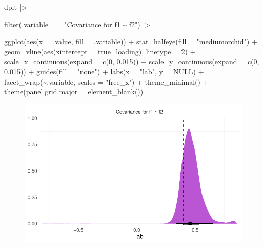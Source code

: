 \documentclass[
  letterpaper,
  DIV=11,
  numbers=noendperiod]{scrreprt}
\newenvironment{Shaded}{\begin{snugshade}}{\end{snugshade}}
\newcommand{\AttributeTok}[1]{\textcolor[rgb]{0.40,0.45,0.13}{#1}}
\newcommand{\ConstantTok}[1]{\textcolor[rgb]{0.56,0.35,0.01}{#1}}
\newcommand{\DecValTok}[1]{\textcolor[rgb]{0.68,0.00,0.00}{#1}}
\newcommand{\FloatTok}[1]{\textcolor[rgb]{0.68,0.00,0.00}{#1}}
\newcommand{\FunctionTok}[1]{\textcolor[rgb]{0.28,0.35,0.67}{#1}}
\newcommand{\NormalTok}[1]{\textcolor[rgb]{0.00,0.23,0.31}{#1}}
\newcommand{\SpecialCharTok}[1]{\textcolor[rgb]{0.37,0.37,0.37}{#1}}
\newcommand{\StringTok}[1]{\textcolor[rgb]{0.13,0.47,0.30}{#1}}
\begin{document}
\begin{Shaded}
\begin{Highlighting}[]
\NormalTok{dplt }\SpecialCharTok{|\textgreater{}}

  \FunctionTok{filter}\NormalTok{(.variable }\SpecialCharTok{==} \StringTok{"Covariance for f1 \textasciitilde{} f2"}\NormalTok{) }\SpecialCharTok{|\textgreater{}}

  \FunctionTok{ggplot}\NormalTok{(}\FunctionTok{aes}\NormalTok{(}\AttributeTok{x =}\NormalTok{ .value, }\AttributeTok{fill =}\NormalTok{ .variable)) }\SpecialCharTok{+}
  \FunctionTok{stat\_halfeye}\NormalTok{(}\AttributeTok{fill =} \StringTok{"mediumorchid"}\NormalTok{) }\SpecialCharTok{+}
  \FunctionTok{geom\_vline}\NormalTok{(}\FunctionTok{aes}\NormalTok{(}\AttributeTok{xintercept =}\NormalTok{ true\_loading), }\AttributeTok{linetype =} \DecValTok{2}\NormalTok{) }\SpecialCharTok{+} 
  \FunctionTok{scale\_x\_continuous}\NormalTok{(}\AttributeTok{expand =} \FunctionTok{c}\NormalTok{(}\DecValTok{0}\NormalTok{, }\FloatTok{0.015}\NormalTok{)) }\SpecialCharTok{+}
  \FunctionTok{scale\_y\_continuous}\NormalTok{(}\AttributeTok{expand =} \FunctionTok{c}\NormalTok{(}\DecValTok{0}\NormalTok{, }\FloatTok{0.015}\NormalTok{)) }\SpecialCharTok{+}
  \FunctionTok{guides}\NormalTok{(}\AttributeTok{fill =} \StringTok{"none"}\NormalTok{) }\SpecialCharTok{+}
  \FunctionTok{labs}\NormalTok{(}\AttributeTok{x =} \StringTok{"lab"}\NormalTok{,}
     \AttributeTok{y =} \ConstantTok{NULL}\NormalTok{)  }\SpecialCharTok{+}
  \FunctionTok{facet\_wrap}\NormalTok{(}\SpecialCharTok{\textasciitilde{}}\NormalTok{.variable, }\AttributeTok{scales =} \StringTok{"free\_x"}\NormalTok{) }\SpecialCharTok{+}
  \FunctionTok{theme\_minimal}\NormalTok{() }\SpecialCharTok{+} 
  \FunctionTok{theme}\NormalTok{(}\AttributeTok{panel.grid.major =} \FunctionTok{element\_blank}\NormalTok{())}
\end{Highlighting}
\end{Shaded}

\begin{figure}[H]

{\centering \includegraphics{./bayesian-cfa_files/figure-pdf/viz-cov-2-fac-1.pdf}

}

\end{figure}
\end{document}
